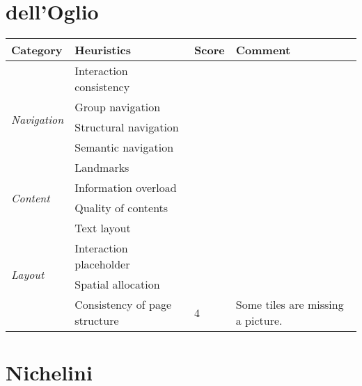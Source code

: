 \documentclass[a4paper, 11pt, parskip=half]{scrreprt}
\begin{document}
\section{dell'Oglio}

\begin{center}
    \def\arraystretch{1.3}
    \begin{tabular}{|l|l|l|m{7cm}|}
        \hline
        \textbf{Category} & \textbf{Heuristics} & \textbf{Score} & \textbf{Comment} \\ \hline
        \multirow{5}{*}{\textit{Navigation}} & Interaction consistency & & \\ \cline{2-4}
        & Group navigation & & \\ \cline{2-4}
        & Structural navigation & & \\ \cline{2-4}
        & Semantic navigation & & \\ \cline{2-4}
        & Landmarks & & \\ \hline
        \multirow{2}{*}{\textit{Content}} & Information overload &  & \\ \cline{2-4}
        & Quality of contents &  & 							\\ \hline
        \multirow{4}{*}{\textit{Layout}} & Text layout & & \\ \cline{2-4}
        & Interaction placeholder & & \\ \cline{2-4}
        & Spatial allocation & & \\ \cline{2-4}
        & Consistency of page structure & 4 & Some tiles are missing a picture. \\ \hline
    \end{tabular}
\end{center}

\section{Nichelini}
\end{document}
